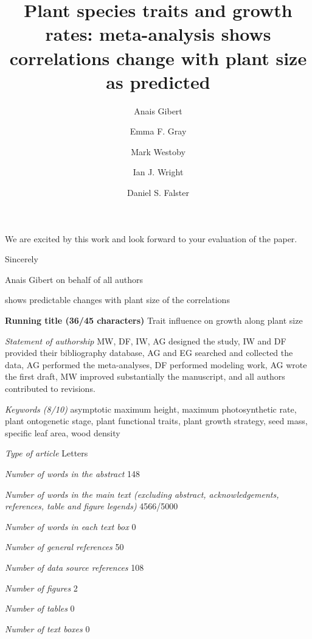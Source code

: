 \documentclass[a4paper]{article}\usepackage[]{graphicx}\usepackage[]{color}
\begin{document}
We are excited by this work and look forward to your evaluation of the paper.



Sincerely

Anais Gibert on behalf of all authors


\newpage

\title{Plant species traits and growth rates: meta-analysis shows correlations change with plant size as predicted}

shows predictable changes with plant size of the correlations 

\author[1]{Anais Gibert}
\author[1]{Emma F. Gray}
\author[1]{Mark Westoby}
\author[1]{Ian J. Wright}
\author[1]{Daniel S. Falster}




\maketitle

\textbf{Running title (36/45 characters)} Trait influence on growth along plant size

\textit{Statement of authorship} MW, DF, IW, AG designed the study, IW and DF provided their bibliography database, AG and EG searched and collected the data, AG performed the meta-analyses, DF performed modeling work, AG wrote the first draft, MW improved substantially the manuscript, and all authors contributed to revisions.

\textit{Keywords (8/10)} asymptotic maximum height, maximum photosynthetic rate, plant ontogenetic stage, plant functional traits, plant growth strategy, seed mass, specific leaf area, wood density

\textit{Type of article} Letters

\textit{Number of words in the abstract} 148

\textit{Number of words in the main text (excluding abstract, acknowledgements, references, table and figure legends)} 4566/5000

\textit{Number of words in each text box} 0

\textit{Number of general references} 50

\textit{Number of data source references} 108

\textit{Number of figures} 2

\textit{Number of tables} 0

\textit{Number of text boxes} 0
\end{document}
